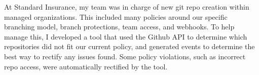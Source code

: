 {
  At Standard Insurance, my team was in charge of new git repo creation within managed organizations. This included many policies around our specific branching model, branch protections, team access, and webhooks. To help manage this, I developed a tool that used the Github API to determine which repositories did not fit our current policy, and generated events to determine the best way to rectify any issues found. Some policy violations, such as incorrect repo access, were automatically rectified by the tool.
}

